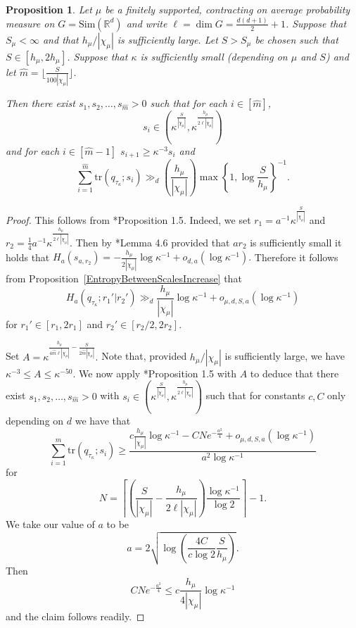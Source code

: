 \documentclass[10pt, english,oneside,reqno]{amsart}
\theoremstyle{plain}
\newtheorem{proposition}[theorem]{Proposition}
\theoremstyle{remark}
\numberwithin{equation}{section}
\numberwithin{figure}{section}
\newcommand{\tr}{\mathrm{tr}}
\newcommand{\R}{\mathbb{R}}
\newcommand{\RWEntropy}{h_{\mu}}
\begin{document}
\begin{proposition}\label{LotsOfTrace}
    Let $\mu$ be a finitely supported, contracting on average probability measure on $G = \mathrm{Sim}(\R^d)$ and write $\ell = \dim G = \frac{d(d + 1)}{2} + 1$. Suppose that $S_{\mu} < \infty$ and that $\RWEntropy/|\chi_{\mu}|$ is sufficiently large. Let $S > S_{\mu}$ be chosen such that $S \in [\RWEntropy, 2\RWEntropy]$. Suppose that $\kappa$ is sufficiently small (depending on $\mu$ and $S$) and let $\widehat{m} = \lfloor \frac{S}{100 |\chi_{\mu}|} \rfloor$.

    Then there exist $s_1, s_2, \ldots , s_{\widehat{m}} > 0$ such that for each $i \in [\widehat{m}]$, $$s_i \in (\kappa^{\frac{S}{|\chi_{\mu}|}}, \kappa^{\frac{\RWEntropy}{2\ell|\chi_{\mu}|}})$$ and for each $i \in [\widehat{m}-1]$ $s_{i + 1} \geq \kappa^{-3}s_i$ and $$\sum_{i = 1}^{\widehat{m}}  \tr(q_{\tau_{\kappa}}; s_i) \gg_d  \left(  \frac{\RWEntropy}{|\chi_{\mu}|} \right) \max\left\{ 1, \log \frac{S}{\RWEntropy} \right\}^{-1}.$$ 
\end{proposition}

\begin{proof}
    This follows from \cite{KittleKoglerEntropy}*{Proposition 1.5}. Indeed, we set $r_1 = a^{-1}\kappa^{\frac{S}{|\chi_{\mu}|}}$ and $r_2 = \frac{1}{4}a^{-1}\kappa^{\frac{\RWEntropy}{2\ell|\chi_{\mu}|}}$. Then by \cite{KittleKoglerEntropy}*{Lemma 4.6} provided that $ar_2$ is sufficiently small it holds that $H_a(s_{a,r_2}) = -\frac{h_{\mu}}{2|\chi_{\mu}|}\log \kappa^{-1} + o_{d,a}(\log \kappa^{-1}).$ Therefore it follows from Proposition~\ref{EntropyBetweenScalesIncrease} that $$H_a(q_{\tau_{\kappa}}; r_1'| r_2') \gg_d \frac{h_{\mu}}{|\chi_{\mu}|}\log \kappa^{-1} + o_{\mu,d,S,a}(\log \kappa^{-1})$$ for $r_1' \in [r_1,2r_1]$ and $r_2' \in [r_2/2,2r_2]$.

    Set $A = \kappa^{\frac{\RWEntropy}{4\widehat{m} \ell |\chi_{\mu}|}-\frac{S}{2\widehat{m}|\chi_{\mu}|}}.$ Note that, provided $\RWEntropy/|\chi_{\mu}|$ is sufficiently large, we have $\kappa^{-3} \leq A \leq \kappa^{-50}$. We now apply \cite{KittleKoglerEntropy}*{Proposition 1.5} with $A$ to deduce that there exist $s_1, s_2, \ldots , s_{\widehat{m}} > 0$ with $s_i \in (\kappa^{\frac{S}{|\chi_{\mu}|}}, \kappa^{\frac{\RWEntropy}{2\ell|\chi_{\mu}|}})$ such that for constants $c, C$ only depending on $d$ we have that $$\sum_{i = 1}^{\widehat{m}}  \tr(q_{\tau_{\kappa}}; s_i) \geq \frac{c\frac{h_{\mu}}{|\chi_{\mu}|}\log \kappa^{-1} - CN e^{-\frac{a^2}{4}} + o_{\mu,d,S,a}(\log \kappa^{-1}) }{a^2 \log \kappa^{-1}}$$ for $$ N = \left\lceil \left( \frac{S}{|\chi_{\mu}|} - \frac{h_{\mu}}{2\ell |\chi_{\mu}|} \right) \frac{\log \kappa^{-1}}{ \log 2}  \right\rceil - 1. $$  We take our value of $a$ to be $$a = 2\sqrt{  \log\left(  \frac{4 C}{c \log 2} \frac{S}{\RWEntropy}  \right) }.$$ Then $$CNe^{-\frac{a^2}{4}} \leq c\frac{\RWEntropy}{4 |\chi_{\mu}|}  \log \kappa^{-1}$$ and the claim follows readily.
\end{proof}
\end{document}

